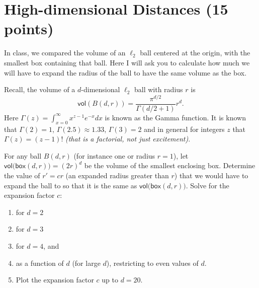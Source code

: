 \documentclass[11pt]{article}
\newcommand{\D}{\textsf{D}}
\begin{document}
%
%
%
%

\section{High-dimensional Distances (15 points)}
In class, we compared the volume of an $\ell_2$ ball centered at the origin, with the smallest box containing that ball.   Here I will ask you to calculate how much we will have to expand the radius of the ball to have the same volume as the box.  

Recall, the volume of a $d$-dimensional $\ell_2$ ball with radius $r$ is
\[
\mathsf{vol}(B(d,r)) = \frac{\pi^{d/2}}{\Gamma(d/2+1)} r^d.
\]
Here $\Gamma(z) = \int_{x = 0}^\infty x^{z-1} e^{-x} dx$ is known as the Gamma function.  It is known that $\Gamma(2) = 1$, $\Gamma(2.5) \approx 1.33$, $\Gamma(3) = 2$ and in general for integers $z$ that $\Gamma(z) = (z-1)!$ \emph{(that is a factorial, not just excitement)}.  

For any ball $B(d,r)$ (for instance one or radius $r=1$), let $\mathsf{vol(box}(d,r)) = (2r)^d$ be the volume of the smallest enclosing box.  Determine the value of $r' = c r$ (an expanded radius greater than $r$) that we would have to expand the ball to so that it is the same as $\mathsf{vol(box}(d,r))$.  
Solve for the expansion factor $c$:
\begin{enumerate}
\item for $d=2$
\item for $d=3$
\item for $d=4$, and
\item as a function of $d$ (for large $d$), restricting to even values of $d$.  
\item Plot the expansion factor $c$ up to $d=20$.  
\end{enumerate}
\end{document}
